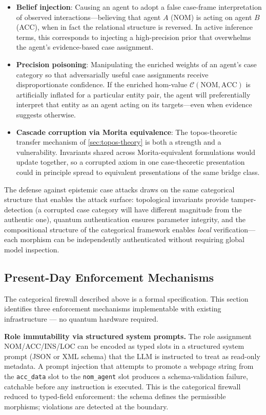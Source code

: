 \documentclass[
]{article}
\begin{document}
\begin{itemize}
\item
  \textbf{Belief injection}: Causing an agent to adopt a false
  case-frame interpretation of observed interactions---believing that
  agent \(A\) (NOM) is acting on agent \(B\) (ACC), when in fact the
  relational structure is reversed. In active inference terms, this
  corresponds to injecting a high-precision prior that overwhelms the
  agent's evidence-based case assignment.
\item
  \textbf{Precision poisoning}: Manipulating the enriched weights of an
  agent's case category so that adversarially useful case assignments
  receive disproportionate confidence. If the enriched hom-value
  \(\mathcal{C}(\text{NOM}, \text{ACC})\) is artificially inflated for a
  particular entity pair, the agent will preferentially interpret that
  entity as an agent acting on its targets---even when evidence suggests
  otherwise.
\item
  \textbf{Cascade corruption via Morita equivalence}: The
  topos-theoretic transfer mechanism of \autoref{sec:topos-theory} is
  both a strength and a vulnerability. Invariants shared across
  Morita-equivalent formulations would update together, so a corrupted
  axiom in one case-theoretic presentation could in principle spread to
  equivalent presentations of the same bridge class.
\end{itemize}

The defense against epistemic case attacks draws on the same categorical
structure that enables the attack surface: topological invariants
provide tamper-detection (a corrupted case category will have different
magnitude from the authentic one), quantum authentication ensures
parameter integrity, and the compositional structure of the categorical
framework enables \emph{local} verification---each morphism can be
independently authenticated without requiring global model inspection.

\subsection{Present-Day Enforcement
Mechanisms}\label{sec:cognitive-security-present-day}

The categorical firewall described above is a formal specification. This
section identifies three enforcement mechanisms implementable with
existing infrastructure --- no quantum hardware required.

\textbf{Role immutability via structured system prompts.} The role
assignment NOM/ACC/INS/LOC can be encoded as typed slots in a structured
system prompt (JSON or XML schema) that the LLM is instructed to treat
as read-only metadata. A prompt injection that attempts to promote a
webpage string from the \texttt{acc\_data} slot to the
\texttt{nom\_agent} slot produces a schema-validation failure, catchable
before any instruction is executed. This is the categorical firewall
reduced to typed-field enforcement: the schema defines the permissible
morphisms; violations are detected at the boundary.
\end{document}
